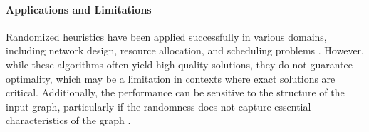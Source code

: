 \paragraph{Applications and Limitations}
Randomized heuristics have been applied successfully in various domains, including network design, resource allocation, and scheduling problems \cite{karp2011maximum}. However, while these algorithms often yield high-quality solutions, they do not guarantee optimality, which may be a limitation in contexts where exact solutions are critical. Additionally, the performance can be sensitive to the structure of the input graph, particularly if the randomness does not capture essential characteristics of the graph \cite{lovasz2013randomized}.
